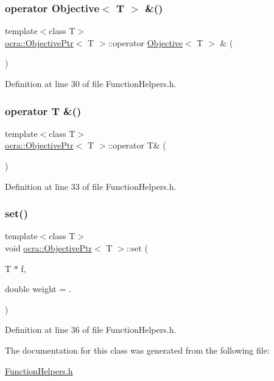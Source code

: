 \subsubsection{\texorpdfstring{operator Objective$<$ T $>$ \&()}{operator Objective< T > \&()}}
{\footnotesize\ttfamily template$<$class T$>$ \\
\hyperlink{classocra_1_1ObjectivePtr}{ocra\+::\+Objective\+Ptr}$<$ T $>$\+::operator \hyperlink{classocra_1_1Objective}{Objective}$<$ T $>$ \& (\begin{DoxyParamCaption}{ }\end{DoxyParamCaption})\hspace{0.3cm}{\ttfamily [inline]}}



Definition at line 30 of file Function\+Helpers.\+h.

\hypertarget{classocra_1_1ObjectivePtr_a5251323d60a6b6c841bb346cc164e37f}{}\label{classocra_1_1ObjectivePtr_a5251323d60a6b6c841bb346cc164e37f} 
\subsubsection{\texorpdfstring{operator T \&()}{operator T \&()}}
{\footnotesize\ttfamily template$<$class T$>$ \\
\hyperlink{classocra_1_1ObjectivePtr}{ocra\+::\+Objective\+Ptr}$<$ T $>$\+::operator T\& (\begin{DoxyParamCaption}{ }\end{DoxyParamCaption})\hspace{0.3cm}{\ttfamily [inline]}}



Definition at line 33 of file Function\+Helpers.\+h.

\hypertarget{classocra_1_1ObjectivePtr_aa65486dfbb8ccd72bfc629a06b967254}{}\label{classocra_1_1ObjectivePtr_aa65486dfbb8ccd72bfc629a06b967254} 
\subsubsection{\texorpdfstring{set()}{set()}}
{\footnotesize\ttfamily template$<$class T$>$ \\
void \hyperlink{classocra_1_1ObjectivePtr}{ocra\+::\+Objective\+Ptr}$<$ T $>$\+::set (\begin{DoxyParamCaption}\item[{T $\ast$}]{f,  }\item[{double}]{weight = {.} }\end{DoxyParamCaption})\hspace{0.3cm}{\ttfamily [inline]}}



Definition at line 36 of file Function\+Helpers.\+h.



The documentation for this class was generated from the following file\+:\begin{DoxyCompactItemize}
\item 
\hyperlink{FunctionHelpers_8h}{Function\+Helpers.\+h}\end{DoxyCompactItemize}
